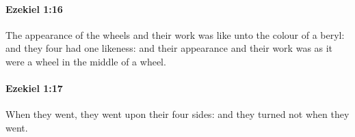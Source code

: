 		\paragraph{Ezekiel 1:16} %
			\label{EZEKIEL-1-16}

			The appearance of the wheels and their work was like unto the colour of a beryl: and they four had one likeness: and their appearance and their work was as it were a wheel in the middle of a wheel.


		\paragraph{Ezekiel 1:17} %
			\label{EZEKIEL-1-17}

			When they went, they went upon their four sides: and they turned not when they went.


